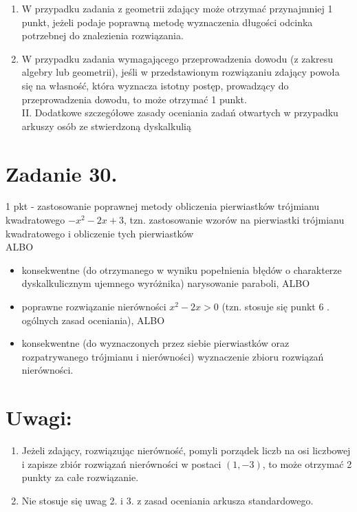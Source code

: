 \documentclass[10pt]{article}
\begin{document}
\begin{enumerate}
  \item W przypadku zadania z geometrii zdający może otrzymać przynajmniej 1 punkt, jeżeli podaje poprawną metodę wyznaczenia długości odcinka potrzebnej do znalezienia rozwiązania.
  \item W przypadku zadania wymagającego przeprowadzenia dowodu (z zakresu algebry lub geometrii), jeśli w przedstawionym rozwiązaniu zdający powoła się na własność, która wyznacza istotny postęp, prowadzący do przeprowadzenia dowodu, to może otrzymać 1 punkt.\\
II. Dodatkowe szczegółowe zasady oceniania zadań otwartych w przypadku arkuszy osób ze stwierdzoną dyskalkulią
\end{enumerate}

\section*{Zadanie 30.}
1 pkt - zastosowanie poprawnej metody obliczenia pierwiastków trójmianu kwadratowego $-x^{2}-2 x+3$, tzn. zastosowanie wzorów na pierwiastki trójmianu kwadratowego i obliczenie tych pierwiastków\\
ALBO

\begin{itemize}
  \item konsekwentne (do otrzymanego w wyniku popełnienia błędów o charakterze dyskalkulicznym ujemnego wyróżnika) narysowanie paraboli, ALBO
  \item poprawne rozwiązanie nierówności $x^{2}-2 x>0$ (tzn. stosuje się punkt 6 . ogólnych zasad oceniania), ALBO
  \item konsekwentne (do wyznaczonych przez siebie pierwiastków oraz rozpatrywanego trójmianu i nierówności) wyznaczenie zbioru rozwiązań nierówności.
\end{itemize}

\section*{Uwagi:}
\begin{enumerate}
  \item Jeżeli zdający, rozwiązując nierówność, pomyli porządek liczb na osi liczbowej i zapisze zbiór rozwiązań nierówności w postaci $(1,-3)$, to może otrzymać 2 punkty za całe rozwiązanie.
  \item Nie stosuje się uwag 2. i 3. z zasad oceniania arkusza standardowego.
\end{enumerate}
\end{document}
